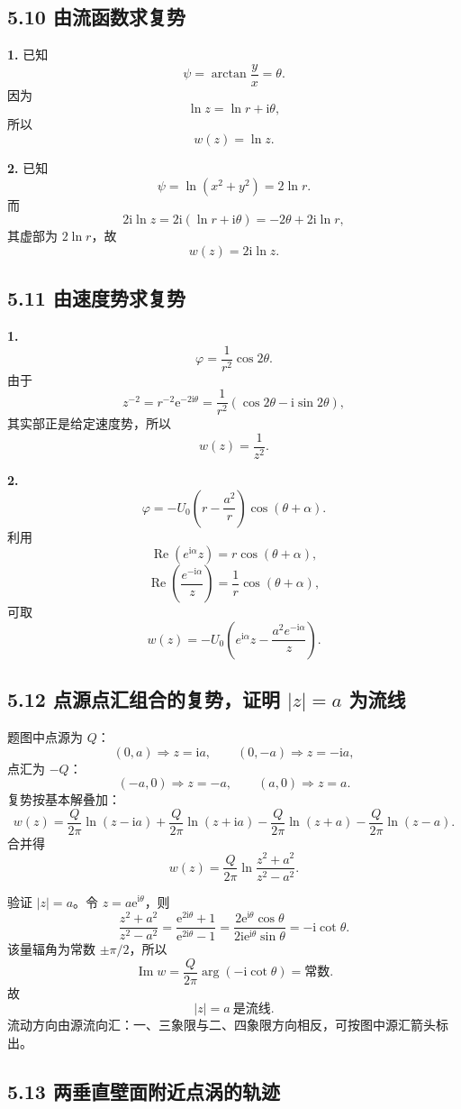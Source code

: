 \documentclass[UTF8,zihao=-4]{ctexart}
\newcommand{\ii}{\mathrm i}
\newcommand{\e}{\mathrm e}
\begin{document}
\subsection*{5.10 由流函数求复势}

\textbf{1.} 已知
\[
\psi=\arctan\frac{y}{x}=\theta .
\]
因为
\[
\ln z=\ln r+\ii\theta,
\]
所以
\[
\boxed{w(z)=\ln z.}
\]

\textbf{2.} 已知
\[
\psi=\ln(x^2+y^2)=2\ln r .
\]
而
\[
2\ii\ln z=2\ii(\ln r+\ii\theta)=-2\theta+2\ii\ln r,
\]
其虚部为 \(2\ln r\)，故
\[
\boxed{w(z)=2\ii\ln z.}
\]

\subsection*{5.11 由速度势求复势}

\textbf{1.}
\[
\varphi=\frac1{r^2}\cos2\theta .
\]
由于
\[
z^{-2}=r^{-2}\e^{-2\ii\theta}
=\frac1{r^2}(\cos2\theta-\ii\sin2\theta),
\]
其实部正是给定速度势，所以
\[
\boxed{w(z)=\frac1{z^2}.}
\]

\textbf{2.}
\[
\varphi=-U_0\left(r-\frac{a^2}{r}\right)\cos(\theta+\alpha).
\]
利用
\[
\operatorname{Re}(e^{\ii\alpha}z)=r\cos(\theta+\alpha),
\]
\[
\operatorname{Re}\left(\frac{e^{-\ii\alpha}}{z}\right)
=\frac1r\cos(\theta+\alpha),
\]
可取
\[
\boxed{
w(z)=-U_0\left(e^{\ii\alpha}z-\frac{a^2e^{-\ii\alpha}}{z}\right).}
\]

\subsection*{5.12 点源点汇组合的复势，证明 \(|z|=a\) 为流线}

题图中点源为 \(Q\)：
\[
(0,a)\Rightarrow z=\ii a,\qquad (0,-a)\Rightarrow z=-\ii a,
\]
点汇为 \(-Q\)：
\[
(-a,0)\Rightarrow z=-a,\qquad (a,0)\Rightarrow z=a .
\]
复势按基本解叠加：
\[
w(z)=\frac{Q}{2\pi}\ln(z-\ii a)
+\frac{Q}{2\pi}\ln(z+\ii a)
-\frac{Q}{2\pi}\ln(z+a)
-\frac{Q}{2\pi}\ln(z-a).
\]
合并得
\[
\boxed{
w(z)=\frac{Q}{2\pi}\ln\frac{z^2+a^2}{z^2-a^2}.}
\]

验证 \(|z|=a\)。令 \(z=a\e^{\ii\theta}\)，则
\[
\frac{z^2+a^2}{z^2-a^2}
=\frac{\e^{2\ii\theta}+1}{\e^{2\ii\theta}-1}
=\frac{2\e^{\ii\theta}\cos\theta}
{2\ii\e^{\ii\theta}\sin\theta}
=-\ii\cot\theta .
\]
该量辐角为常数 \(\pm\pi/2\)，所以
\[
\operatorname{Im}w=\frac{Q}{2\pi}\arg(-\ii\cot\theta)
=\text{常数}.
\]
故
\[
\boxed{|z|=a\ \text{是流线}.}
\]
流动方向由源流向汇：一、三象限与二、四象限方向相反，可按图中源汇箭头标出。

\subsection*{5.13 两垂直壁面附近点涡的轨迹}
\end{document}

